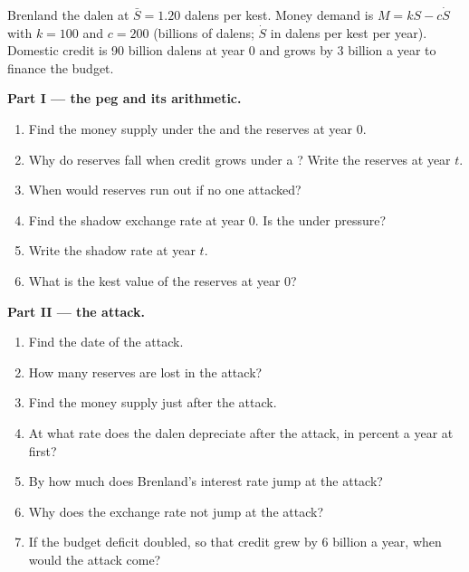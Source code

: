 \begin{problem}\label{pb:b3:exchange-rate-regimes:peg}
Brenland  the dalen at $\bar S = 1.20$ dalens per kest. Money demand is $M = kS - c\dot S$
with $k = 100$ and $c = 200$ (billions of dalens; $\dot S$ in dalens per kest per year). Domestic
credit is 90 billion dalens at year 0 and grows by 3 billion a year to finance the
budget. %

\medskip\noindent\textbf{Part I --- the peg and its arithmetic.}
\begin{enumerate}
\item Find the money supply under the  and the reserves at year 0.
\item Why do reserves fall when credit grows under a ? Write the reserves at year $t$.
\item When would reserves run out if no one attacked?
\item Find the shadow exchange rate at year 0. Is the  under pressure?
\item Write the shadow rate at year $t$.
\item What is the kest value of the reserves at year 0?
\end{enumerate}

\medskip\noindent\textbf{Part II --- the attack.}
\begin{enumerate}[resume]
\item Find the date of the attack.
\item How many reserves are lost in the attack?
\item Find the money supply just after the attack.
\item At what rate does the dalen depreciate after the attack, in percent a year at
first?
\item By how much does Brenland's interest rate jump at the attack?
\item Why does the exchange rate not jump at the attack?
\item If the budget deficit doubled, so that credit grew by 6 billion a year, when
would the attack come?
\end{enumerate}


\end{problem}
